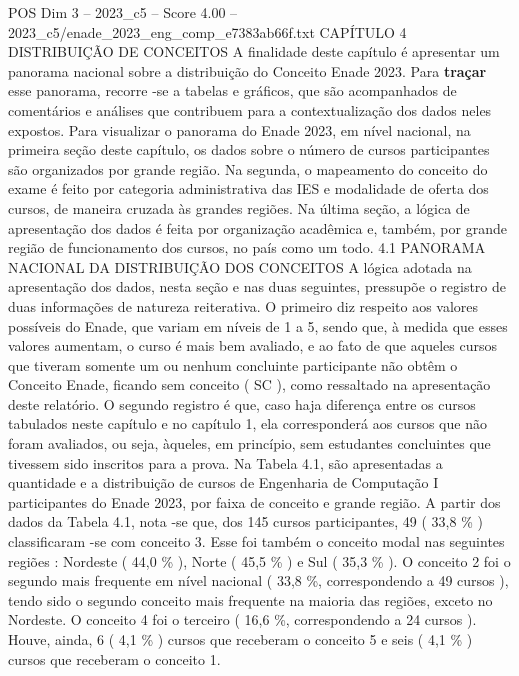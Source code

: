 \begin{textsample}{POS Dim 3 – 2023\_c5 – Score 4.00 – 2023\_c5/enade\_2023\_eng\_comp\_e7383ab66f.txt}  \label{ex:f3_pos_057}
CAPÍTULO 4 DISTRIBUIÇÃO DE CONCEITOS A finalidade deste capítulo é apresentar um panorama nacional sobre a distribuição do Conceito Enade 2023.
Para \textbf{traçar} esse panorama, recorre -se a tabelas e gráficos, que são acompanhados de comentários e análises que contribuem para a contextualização dos dados neles expostos.
Para visualizar o panorama do Enade 2023, em nível nacional, na primeira seção deste capítulo, os dados sobre o número de cursos participantes são organizados por grande região.
Na segunda, o mapeamento do conceito do exame é feito por categoria administrativa das IES e modalidade de oferta dos cursos, de maneira cruzada às grandes regiões.
Na última seção, a lógica de apresentação dos dados é feita por organização acadêmica e, também, por grande região de funcionamento dos cursos, no país como um todo. 4.1 PANORAMA NACIONAL DA DISTRIBUIÇÃO DOS CONCEITOS A lógica adotada na apresentação dos dados, nesta seção e nas duas seguintes, pressupõe o registro de duas informações de natureza reiterativa.
O primeiro diz respeito aos valores possíveis do Enade, que variam em níveis de 1 a 5, sendo que, à medida que esses valores aumentam, o curso é mais bem avaliado, e ao fato de que aqueles cursos que tiveram somente um ou nenhum concluinte participante não obtêm o Conceito Enade, ficando sem conceito ( SC ), como ressaltado na apresentação deste relatório.
O segundo registro é que, caso haja diferença entre os cursos tabulados neste capítulo e no capítulo 1, ela corresponderá aos cursos que não foram avaliados, ou seja, àqueles, em princípio, sem estudantes concluintes que tivessem sido inscritos para a prova.
Na Tabela 4.1, são apresentadas a quantidade e a distribuição de cursos de Engenharia de Computação I participantes do Enade 2023, por faixa de conceito e grande região.
A partir dos dados da Tabela 4.1, nota -se que, dos 145 cursos participantes, 49 ( 33,8 \% ) classificaram -se com conceito 3.
Esse foi também o conceito modal nas seguintes regiões : Nordeste ( 44,0 \% ), Norte ( 45,5 \% ) e Sul ( 35,3 \% ).
O conceito 2 foi o segundo mais frequente em nível nacional ( 33,8 \%, correspondendo a 49 cursos ), tendo sido o segundo conceito mais frequente na maioria das regiões, exceto no Nordeste.
O conceito 4 foi o terceiro ( 16,6 \%, correspondendo a 24 cursos ).
Houve, ainda, 6 ( 4,1 \% ) cursos que receberam o conceito 5 e seis ( 4,1 \% ) cursos que receberam o conceito 1.

\end{textsample}
